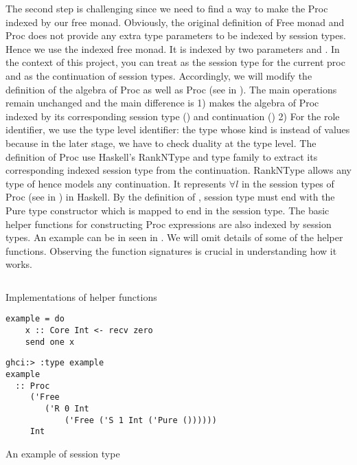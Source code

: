 The second step is challenging since we need to find a way to make the Proc indexed by our free monad. Obviously, the original definition of Free monad and Proc does not provide any extra type parameters to be indexed by session types. Hence we use the indexed free monad. It is indexed by two parameters  and . In the context of this project, you can treat  as the session type for the current proc  and  as the continuation of session types. Accordingly, we will modify the definition of the algebra of Proc as well as Proc (see in ). The main operations remain unchanged and the main difference is 1) makes the algebra of Proc indexed by its corresponding session type () and continuation () 2) For the role identifier, we use the type level identifier: the type whose kind is  instead of values because in the later stage, we have to check duality at the type level. The definition of Proc use Haskell's RankNType and type family \hask{>*>} to extract its corresponding indexed session type  from the continuation. RankNType allows any type of  hence models any continuation. It represents $\forall l$ in the session types of Proc (see in ) in Haskell. By the definition of \hask{>*>}, session type  must end with the Pure type constructor which is mapped to end in the session type. The basic helper functions for constructing Proc expressions are also indexed by session types. An example can be in seen in . We will omit details of some of the helper functions. Observing the function signatures is crucial in understanding how it works.
\begin{listing}[ht]
    \inputminted{Haskell}{impl/typehelper.hs}
    \caption{Implementations of helper functions}
    \label{impl:code:typehelper}
\end{listing}

\begin{listing}[ht]
\begin{verbatim}
example = do
    x :: Core Int <- recv zero 
    send one x
\end{verbatim}
\begin{verbatim}
ghci:> :type example
example
  :: Proc
     ('Free
        ('R 0 Int
            ('Free ('S 1 Int ('Pure ())))))
     Int
\end{verbatim}
    \caption{An example of session type}
    \label{impl:code:typeexample}
\end{listing}

